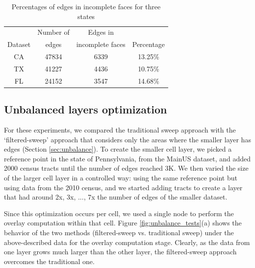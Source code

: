 \begin{table}
    \centering
    \caption{Percentages of edges in incomplete faces for three states} \label{tab:percentages}
    \begin{tabular}{cccc}
        \toprule
                & Number of & Edges in         &            \\
        Dataset & edges     & incomplete faces & Percentage \\
        \midrule
        CA &  47834 &  6339 & 13.25\% \\
        TX &  41227 &  4436 & 10.75\%\\
        FL &  24152 &  3547 & 14.68\%\\
        \bottomrule
    \end{tabular}
\end{table}

\subsection{Unbalanced layers optimization}
For these experiments, we compared the traditional sweep approach with the `filtered-sweep' approach that considers only the areas where the smaller layer has edges (Section \ref{sec:unbalance}).  To create the smaller cell layer, we picked a reference point in the state of Pennsylvania, from the MainUS dataset, and added 2000 census tracts until the number of edges reached 3K. We then varied the size of the larger cell layer in a controlled way: using the same reference point but using data from the 2010 census, and we started adding tracts to create a layer that had around 2x, 3x, ..., 7x the number of edges of the smaller dataset.

Since this optimization occurs per cell, we used a single node to perform the overlay computation within that cell. Figure \ref{fig:unbalance_tests}(a) shows the behavior of the two methods (filtered-sweep vs. traditional sweep) under the above-described data for the overlay computation stage.  Clearly, as the data from one layer grows much larger than the other layer, the filtered-sweep approach overcomes the traditional one.

